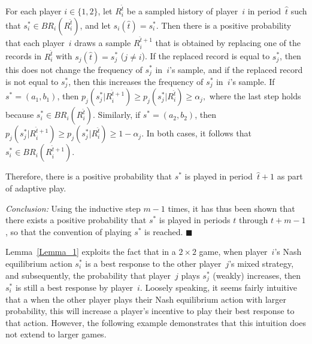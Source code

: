 \documentclass[11.5pt]{article}
\begin{document}
For each player $i\in \{1,2\}$, let $R_i^{\hat{t}}$ be a sampled history of player~$i$ in period~$\hat{t}$ such that $s^*_i\in BR_i(R_i^{\hat{t}})$, and let $s_i(\hat{t})=s_i^*$. Then there is a positive probability that each player~$i$ draws a sample $R_i^{\hat{t}+1}$ that is obtained by replacing one of the records in $R_i^{\hat{t}}$ with $s_j(\hat{t})=s_j^*$ ($j\neq i$). If the replaced record is equal to $s_j^*$, then this does not change the frequency of $s_j^*$ in~$i$'s sample, and if the replaced record is not equal to $s_j^*$, then this increases the frequency of $s_j^*$ in~$i$'s sample. 
If $s^* =(a_1,b_1)$, then $p_j(s_j^* | R_i^{\hat{t}+1})\geq p_j(s_j^* | R_i^{\hat{t}})\geq \alpha_j,$ where the last step holds because $s^*_i\in BR_i(R_i^{\hat{t}})$. 
Similarly, if $s^* =(a_2,b_2)$, then $p_j(s_j^* | R_i^{\hat{t}+1})\geq p_j(s_j^* | R_i^{\hat{t}})\geq 1-\alpha_j.$ 
In both cases,  it follows that $s^*_i\in BR_i(R_i^{\hat{t}+1})$.%

Therefore, there is a positive probability that $s^*$ is played in period~$\hat{t}+1$ as part of adaptive play. 

\medskip
\textit{Conclusion:} Using the inductive step $m-1$ times, it has thus been shown that there exists a positive probability that $s^*$ is played in periods $t$ through $t+m-1$, so that the convention of playing $s^*$ is reached.
$\blacksquare$



\bigskip

Lemma~\ref{Lemma_1} exploits the fact that in a $2\times 2$ game, when player~$i$'s Nash equilibrium action $s_i^*$ is a best response to the other player~$j$'s mixed strategy, and subsequently, the probability that player~$j$ plays $s_j^*$ (weakly) increases, then $s_i^*$ is still a best response by player~$i$. 
Loosely speaking, it seems fairly intuitive that a when the other player plays their Nash equilibrium action with larger probability, this will increase a player's incentive to play their best response to that action. However, the following example demonstrates that this intuition does not extend to larger games. 
\end{document}

